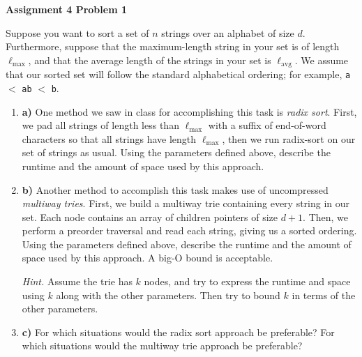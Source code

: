 \documentclass[12pt]{article}
\begin{document}
	
	\begin{center}
		
		{\Large\bf Assignment 4 Problem 1}\\
		\vspace{3mm}
	\end{center}
	
	\def\question#1{\item[\bf #1.]}
	\def\part#1{\item[\bf #1)]}
	\newcommand{\pc}[1]{\mbox{\textbf{#1}}} %
	
	
	
	Suppose you want to sort a set of $n$ strings over an alphabet of size $d$. 
	Furthermore, suppose that the maximum-length string in your set is of length $\ell_{\text{max}}$, 
	and that the average length of the strings in your set is $\ell_{\text{avg}}$. 
	We assume that our sorted set will follow the standard alphabetical ordering; 
	for example, \texttt{a} $<$ \texttt{ab} $<$ \texttt{b}.
	
	\begin{enumerate}
		\part{a} One method we saw in class for accomplishing this task is \textit{radix sort}. 
		First, we pad all strings of length less than $\ell_{\text{max}}$ with a suffix of end-of-word characters so that
		all strings have length $\ell_{\text{max}}$, then we run radix-sort on our set of strings as usual. 
		Using the parameters defined above, describe the runtime and the amount of space used by this approach.
		
		\part{b} Another method to accomplish this task makes use of uncompressed \textit{multiway tries}. 
		First, we build a multiway trie containing every string in our set. 
		Each node contains an array of children pointers of size $d+1$. 
		Then, we perform a preorder traversal and read each string, giving us a sorted ordering. 
		Using the parameters defined above, describe the runtime and the amount of space used by this approach.
		A big-O bound is acceptable.
		
		\textsl{Hint.} Assume the trie has $k$ nodes, and try to express the runtime and space using $k$ along with the other parameters.  Then try to bound $k$ in terms of the other parameters.
		
		\part{c} For which situations would the radix sort approach be preferable? For which situations would the multiway trie approach be preferable?
		
	\end{enumerate}
	
\end{document}

